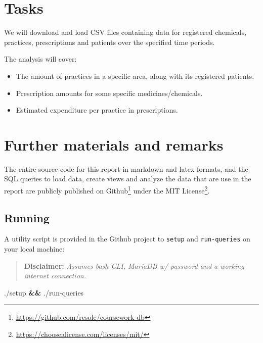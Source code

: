 \documentclass[english,a4paper,]{report}
\newenvironment{Shaded}{}{}
\newcommand{\KeywordTok}[1]{\textcolor[rgb]{0.00,0.44,0.13}{\textbf{#1}}}
\newcommand{\ExtensionTok}[1]{#1}
\renewcommand{\href}[2]{#2\footnote{\url{#1}}}
\providecommand{\tightlist}{%
  \setlength{\itemsep}{0pt}\setlength{\parskip}{0pt}}
\begin{document}
\section{Tasks}\label{tasks}

We will download and load CSV files containing data for registered
chemicals, practices, prescriptions and patients over the specified time
periods.

The analysis will cover:

\begin{itemize}
\tightlist
\item
  The amount of practices in a specific area, along with its registered
  patients.
\item
  Prescription amounts for some specific medicines/chemicals.
\item
  Estimated expenditure per practice in prescriptions.
\end{itemize}

\section{Further materials and
remarks}\label{further-materials-and-remarks}

The entire source code for this report in markdown and latex formats,
and the SQL queries to load data, create views and analyze the data that
are use in the report are publicly published on
\href{https://github.com/rcsole/coursework-db}{Github} under the
\href{https://choosealicense.com/licenses/mit/}{MIT License}.

\subsection{Running}\label{running}

A utility script is provided in the Github project to \texttt{setup} and
\texttt{run-queries} on your local machine:

\begin{quote}
\textbf{Disclaimer:} \emph{Assumes bash CLI, MariaDB w/ password and a
working internet connection.}
\end{quote}

\begin{Shaded}
\begin{Highlighting}[]
\ExtensionTok{./setup} \KeywordTok{&&} \ExtensionTok{./run-queries}
\end{Highlighting}
\end{Shaded}
\end{document}
